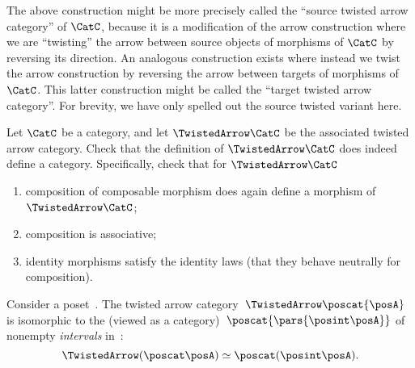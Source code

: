 \begin{remark}
    The above construction might be more precisely called the ``source twisted arrow category'' of $\CatC$, because it is a modification of the arrow construction where we are ``twisting'' the arrow between source objects of morphisms of $\CatC$ by reversing its direction.
    An analogous construction exists where instead we twist the arrow construction by reversing the arrow between targets of morphisms of $\CatC$.
    This latter construction might be called the ``target twisted arrow category''.
    For brevity, we have only spelled out the source twisted variant here.
\end{remark}

\begin{gradedexercise}
    \label{ex:TwistedCat}

    Let $\CatC$ be a category, and let $\TwistedArrow\CatC$ be the associated twisted arrow category.
    Check that the definition of $\TwistedArrow\CatC$ does indeed define a category.
    Specifically, check that for $\TwistedArrow\CatC$
    \begin{enumerate}
        \item composition of composable morphism does again define a morphism of $\TwistedArrow\CatC$;
        \item composition is associative;
        \item identity morphisms satisfy the identity laws (that they behave neutrally for composition).
    \end{enumerate}
\end{gradedexercise}


\begin{example}
    \label{exa:twisted-arrow-poset}
    Consider a poset~\posA.
    The twisted arrow category~$\TwistedArrow \poscat{\posA}$ is isomorphic to the  (viewed as a category)~$\poscat{\pars{\posint\posA}}$ of nonempty \emph{intervals} in~\posA:
    \begin{equation}
        \TwistedArrow (\poscat \posA) \simeq \poscat (\posint\posA) .
    \end{equation}
\end{example}

